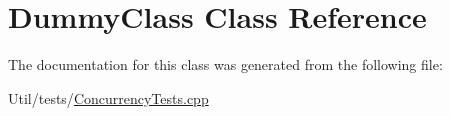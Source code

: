 \hypertarget{classDummyClass}{}\section{Dummy\+Class Class Reference}
\label{classDummyClass}


The documentation for this class was generated from the following file\+:\begin{DoxyCompactItemize}
\item 
Util/tests/\mbox{\hyperlink{ConcurrencyTests_8cpp}{Concurrency\+Tests.\+cpp}}\end{DoxyCompactItemize}
